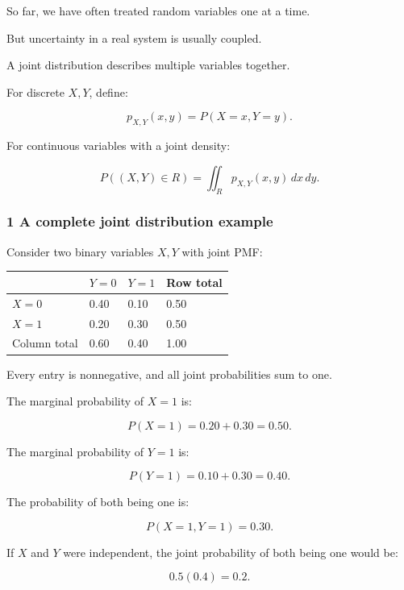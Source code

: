 \hypertarget{02-foundations-ii-ch023-joint-distributions}{}

So far, we have often treated random variables one at a time.

But uncertainty in a real system is usually coupled.

A joint distribution describes multiple variables together.

For discrete \(X,Y\), define:

\[
 \boxed{ p_{X,Y}(x,y)=P(X=x,Y=y) }.
\]

For continuous variables with a joint density:

\[
 \boxed{ P((X,Y)\in R) = \iint_Rp_{X,Y}(x,y)\,dx\,dy }.
\]

\subsubsection{1 A complete joint distribution example}\label{02-foundations-ii-ch023-a-complete-joint-distribution-example}

\hypertarget{02-foundations-ii-ch023-a-complete-joint-distribution-example}{}

Consider two binary variables \(X,Y\) with joint PMF:

{\def\LTcaptype{none} %
\begin{longtable}[]{@{}llll@{}}
\toprule\noalign{}
& \(Y=0\) & \(Y=1\) & Row total \\
\midrule\noalign{}
\endhead
\bottomrule\noalign{}
\endlastfoot
\(X=0\) & 0.40 & 0.10 & 0.50 \\
\(X=1\) & 0.20 & 0.30 & 0.50 \\
Column total & 0.60 & 0.40 & 1.00 \\
\end{longtable}
}

Every entry is nonnegative, and all joint probabilities sum to one.

The marginal probability of \(X=1\) is:

\[
 P(X=1)=0.20+0.30=0.50.
\]

The marginal probability of \(Y=1\) is:

\[
 P(Y=1)=0.10+0.30=0.40.
\]

The probability of both being one is:

\[
 P(X=1,Y=1)=0.30.
\]

If \(X\) and \(Y\) were independent, the joint probability of both being one would be:

\[
 0.5(0.4)=0.2.
\]

